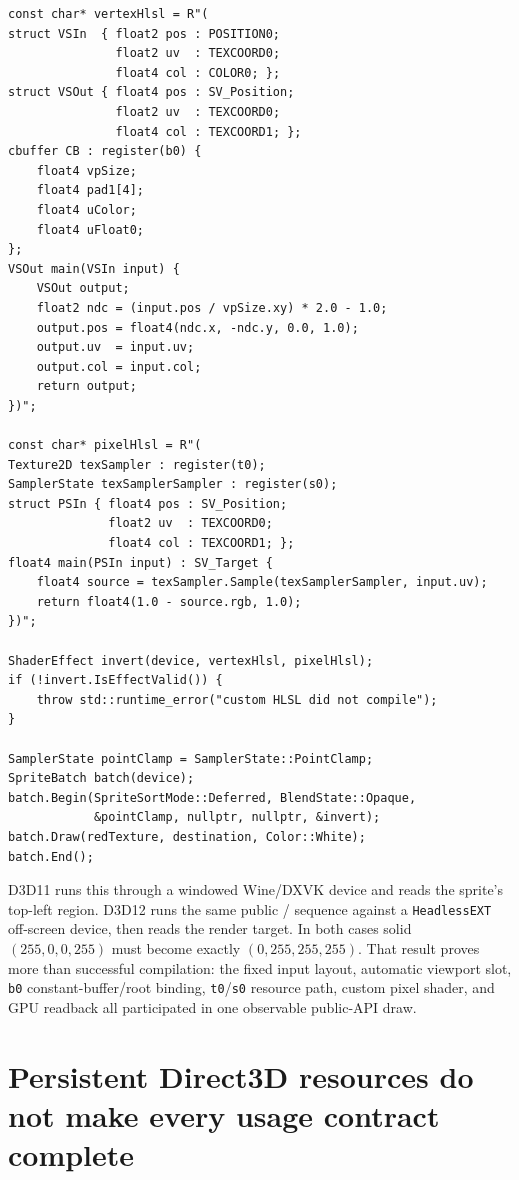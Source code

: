 \begin{lstlisting}
const char* vertexHlsl = R"(
struct VSIn  { float2 pos : POSITION0;
               float2 uv  : TEXCOORD0;
               float4 col : COLOR0; };
struct VSOut { float4 pos : SV_Position;
               float2 uv  : TEXCOORD0;
               float4 col : TEXCOORD1; };
cbuffer CB : register(b0) {
    float4 vpSize;
    float4 pad1[4];
    float4 uColor;
    float4 uFloat0;
};
VSOut main(VSIn input) {
    VSOut output;
    float2 ndc = (input.pos / vpSize.xy) * 2.0 - 1.0;
    output.pos = float4(ndc.x, -ndc.y, 0.0, 1.0);
    output.uv  = input.uv;
    output.col = input.col;
    return output;
})";

const char* pixelHlsl = R"(
Texture2D texSampler : register(t0);
SamplerState texSamplerSampler : register(s0);
struct PSIn { float4 pos : SV_Position;
              float2 uv  : TEXCOORD0;
              float4 col : TEXCOORD1; };
float4 main(PSIn input) : SV_Target {
    float4 source = texSampler.Sample(texSamplerSampler, input.uv);
    return float4(1.0 - source.rgb, 1.0);
})";

ShaderEffect invert(device, vertexHlsl, pixelHlsl);
if (!invert.IsEffectValid()) {
    throw std::runtime_error("custom HLSL did not compile");
}

SamplerState pointClamp = SamplerState::PointClamp;
SpriteBatch batch(device);
batch.Begin(SpriteSortMode::Deferred, BlendState::Opaque,
            &pointClamp, nullptr, nullptr, &invert);
batch.Draw(redTexture, destination, Color::White);
batch.End();
\end{lstlisting}

D3D11 runs this through a windowed Wine/DXVK device and reads the sprite's top-left region.
D3D12 runs the same public / sequence against a
\texttt{HeadlessEXT} off-screen device, then reads the render target. In both cases solid
\((255,0,0,255)\) must become exactly \((0,255,255,255)\). That result proves more than
successful compilation: the fixed input layout, automatic viewport slot, \texttt{b0}
constant-buffer/root binding, \texttt{t0}/\texttt{s0} resource path, custom pixel shader, and
GPU readback all participated in one observable public-API draw.

\section{Persistent Direct3D resources do not make every usage contract complete}

